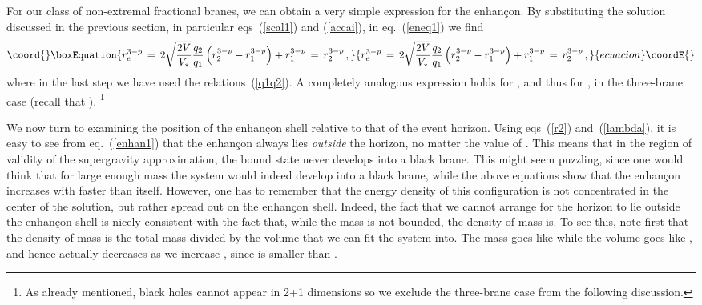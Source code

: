 \documentclass[a4paper,11pt]{article}
\providecommand{\eqref}[1]{(\ref{#1})}
\begin{document}
For our class of non-extremal fractional branes, we can obtain a very
simple expression for the enhan\c{c}on. By substituting the solution
discussed in the previous section, in particular eqs~\eqref{scal1} and
\eqref{accai}, in eq.~\eqref{eneq1} we find
\begin{equation}\coord{}\boxEquation{
\label{enhan1}
r_e^{3-p}\,=\, 2 \sqrt{\frac{2 V}{V_*}} \frac{q_2}{q_1}
\left(r_2^{3-p}- r_1^{3-p}\right)+ r_1^{3-p} \,= \,r_2^{3-p} \,,
}{
r_e^{3-p}\,=\, 2 \sqrt{\frac{2 V}{V_*}} \frac{q_2}{q_1}
\left(r_2^{3-p}- r_1^{3-p}\right)+ r_1^{3-p} \,= \,r_2^{3-p} \,,
}{ecuacion}\coordE{}\end{equation}
where in the last step we have used the relations~\eqref{q1q2}. A
completely analogous expression holds for \coordHE{}, and thus for \coordHE{},
in the three-brane case (recall that \coordHE{}).%
\footnote{As already mentioned, black holes cannot appear in 2+1
dimensions  so we exclude the three-brane case from the following
discussion.}

We now turn to examining the position of the enhan\c{c}on shell
relative to that of the event horizon. Using eqs~\eqref{r2}
and~\eqref{lambda}, it is easy to see from eq.~\eqref{enhan1} that
the enhan\c{c}on always lies \emph{outside} the horizon, no matter
the value of \coordHE{}. This means that in the region of validity of the
supergravity approximation, the bound state never develops into a
black brane. This might seem puzzling, since one would think that for
large enough mass the system would indeed develop into a black brane,
while the above equations show that the enhan\c{c}on increases with
\coordHE{} faster than \coordHE{} itself. However, one has to remember that the
energy density of this configuration is not concentrated in the center
of the solution, but rather spread out on the enhan\c{c}on
shell. Indeed, the fact that we cannot arrange for the horizon to lie
outside the enhan\c{c}on shell is nicely consistent with the fact
that, while the mass is not bounded, the density of mass is. To see
this, note first that the density of mass is the total mass \coordHE{}
divided by the volume \coordHE{} that we can fit the system
into. The mass \coordHE{} goes like \coordHE{} while the volume \coordHE{} goes like \coordHE{}, and hence \coordHE{} actually
decreases as we increase \coordHE{}, since \coordHE{} is smaller than \coordHE{}.
\end{document}
